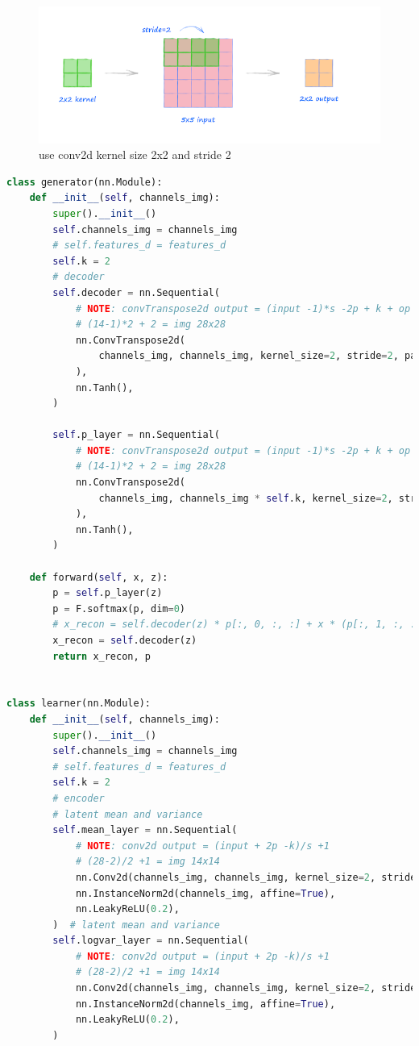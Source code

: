 \documentclass[12pt]{article}
\begin{document}
\begin{figure}[H]
    \centering
    \includegraphics[width=0.5\linewidth]{../fig/2x2kernelstrike2.png} %
    \caption{use conv2d kernel size 2x2 and stride 2}
    \label{fig:conv2d}
\end{figure}

\begin{lstlisting}[language=Python, caption= GAN and VAE model]
  class generator(nn.Module):
    def __init__(self, channels_img):
        super().__init__()
        self.channels_img = channels_img
        # self.features_d = features_d
        self.k = 2
        # decoder
        self.decoder = nn.Sequential(
            # NOTE: convTranspose2d output = (input -1)*s -2p + k + op
            # (14-1)*2 + 2 = img 28x28
            nn.ConvTranspose2d(
                channels_img, channels_img, kernel_size=2, stride=2, padding=0
            ),
            nn.Tanh(),
        )

        self.p_layer = nn.Sequential(
            # NOTE: convTranspose2d output = (input -1)*s -2p + k + op
            # (14-1)*2 + 2 = img 28x28
            nn.ConvTranspose2d(
                channels_img, channels_img * self.k, kernel_size=2, stride=2, padding=0
            ),
            nn.Tanh(),
        )

    def forward(self, x, z):
        p = self.p_layer(z)
        p = F.softmax(p, dim=0)
        # x_recon = self.decoder(z) * p[:, 0, :, :] + x * (p[:, 1, :, :])
        x_recon = self.decoder(z)
        return x_recon, p


class learner(nn.Module):
    def __init__(self, channels_img):
        super().__init__()
        self.channels_img = channels_img
        # self.features_d = features_d
        self.k = 2
        # encoder
        # latent mean and variance
        self.mean_layer = nn.Sequential(
            # NOTE: conv2d output = (input + 2p -k)/s +1
            # (28-2)/2 +1 = img 14x14
            nn.Conv2d(channels_img, channels_img, kernel_size=2, stride=2),
            nn.InstanceNorm2d(channels_img, affine=True),
            nn.LeakyReLU(0.2),
        )  # latent mean and variance
        self.logvar_layer = nn.Sequential(
            # NOTE: conv2d output = (input + 2p -k)/s +1
            # (28-2)/2 +1 = img 14x14
            nn.Conv2d(channels_img, channels_img, kernel_size=2, stride=2),
            nn.InstanceNorm2d(channels_img, affine=True),
            nn.LeakyReLU(0.2),
        )


\end{lstlisting}
\end{document}
